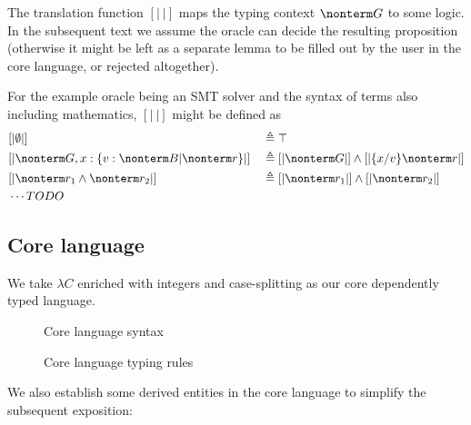\documentclass[a4paper]{article}
\begin{document}
The translation function $[|\ |]$ maps the typing context $\nonterm G$ to some logic.
In the subsequent text we assume the oracle can decide the resulting proposition
(otherwise it might be left as a separate lemma to be filled out by the user in the core language, or rejected altogether).

For the example oracle being an SMT solver and the syntax of terms also including mathematics, $[|\ |]$ might be defined as
\begin{equation}
\begin{aligned}
  & [| \emptyset |]                                         && \triangleq \top																						 \\
  & [| \nonterm G, x : \{ v : \nonterm B | \nonterm r \} |] && \triangleq [| \nonterm G |] \land [| \{x/v\} \nonterm r |] \\
  & [| \nonterm r_1 \land \nonterm r_2 |]                   && \triangleq [| \nonterm r_1 |] \land [| \nonterm r_2 |]		 \\
  & \cdots TODO
\end{aligned}
\end{equation}


\subsection{Core language}

We take $\lambda C$ \cite{Nederpelt14} enriched with integers and case-splitting as our core dependently typed language.

\begin{figure}[ht]
  \footnotesize
  \caption{Core language syntax}
  \label{fig:core_syntax}
\end{figure}

\begin{figure}[ht]
  \footnotesize
  \caption{Core language typing rules}
  \label{fig:core_typing}
\end{figure}

We also establish some derived entities in the core language to simplify the subsequent exposition:
\end{document}
